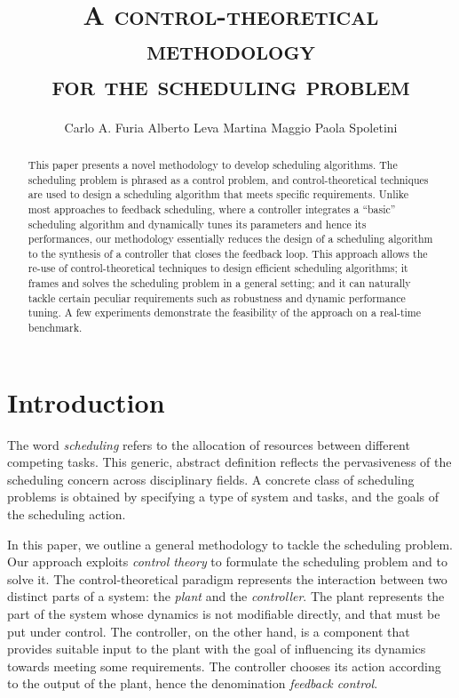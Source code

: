 \documentclass[a4paper]{article}
\title{\textsc{A control-theoretical methodology \\ for the scheduling problem}}
\author{Carlo A. Furia  Alberto Leva  Martina Maggio  Paola Spoletini}
\date{}
\begin{document}
\maketitle


\begin{abstract}
This paper presents a novel methodology to develop scheduling algorithms.
The scheduling problem is phrased as a control problem, and control-theoretical
techniques are used to design a scheduling algorithm that meets specific
requirements.
Unlike most approaches to feedback scheduling, where a controller integrates
a ``basic'' scheduling algorithm and dynamically tunes its parameters and hence
its performances, our methodology essentially reduces the design of a
scheduling algorithm to the synthesis of a controller that closes the feedback loop.
This approach allows the re-use of control-theoretical techniques to design
efficient scheduling algorithms; it frames and solves the scheduling problem
in a general setting; and it can naturally tackle certain peculiar requirements
such as robustness and dynamic performance tuning.
A few experiments demonstrate the feasibility of the approach on a real-time
benchmark.
\end{abstract}




\section{Introduction}
\label{sec:introduction}

The word \emph{scheduling} refers to the allocation of resources between
different competing tasks. This generic, abstract definition reflects the
pervasiveness of the scheduling concern across disciplinary fields.
A concrete class of scheduling problems is obtained by specifying a type of
system and tasks, and the goals of the scheduling action.

In this paper, we outline a general methodology to tackle the scheduling
problem. Our approach exploits \emph{control theory} to formulate the
scheduling problem and to solve it. The control-theoretical paradigm represents
the interaction between two distinct parts of a system: the \emph{plant} and
the \emph{controller}. The plant represents the part of the system whose 
dynamics is not modifiable directly, and that must be put under control.
The controller, on the other hand, is a component that provides suitable input
to the plant with the goal of influencing its dynamics towards meeting some
requirements. The controller chooses its action according to the output of the
plant, hence the denomination \emph{feedback control}.
\end{document}
